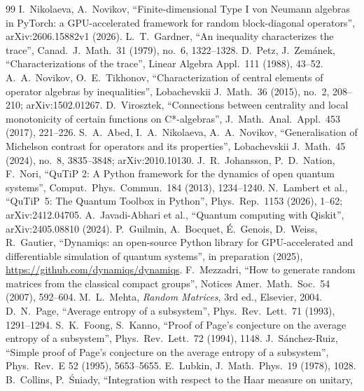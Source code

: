 \documentclass[11pt]{article}
\begin{document}
{\sloppy
\begin{thebibliography}{99}
 I.~Nikolaeva, A.~Novikov, ``Finite-dimensional Type I von Neumann algebras in PyTorch: a
  GPU-accelerated framework for random block-diagonal operators'', arXiv:2606.15882v1 (2026).
 L.~T.~Gardner, ``An inequality characterizes the trace'', Canad.\ J.\ Math.\ 31
  (1979), no.~6, 1322--1328.
 D.~Petz, J.~Zem\'anek, ``Characterizations of the trace'', Linear Algebra Appl.\ 111
  (1988), 43--52.
 A.~A.~Novikov, O.~E.~Tikhonov, ``Characterization of central elements of operator
  algebras by inequalities'', Lobachevskii J.\ Math.\ 36 (2015), no.~2, 208--210; arXiv:1502.01267.
 D.~Virosztek, ``Connections between centrality and local monotonicity of certain
  functions on C*-algebras'', J.\ Math.\ Anal.\ Appl.\ 453 (2017), 221--226.
 S.~A.~Abed, I.~A.~Nikolaeva, A.~A.~Novikov, ``Generalisation of Michelson contrast for
  operators and its properties'', Lobachevskii J.\ Math.\ 45 (2024), no.~8, 3835--3848; arXiv:2010.10130.
 J.~R.~Johansson, P.~D.~Nation, F.~Nori, ``QuTiP 2: A Python framework for the
  dynamics of open quantum systems'', Comput.\ Phys.\ Commun.\ 184 (2013), 1234--1240.
 N.~Lambert et al., ``QuTiP~5: The Quantum Toolbox in Python'', Phys.\ Rep.\ 1153 (2026),
  1--62; arXiv:2412.04705.
 A.~Javadi-Abhari et al., ``Quantum computing with Qiskit'', arXiv:2405.08810 (2024).
 P.~Guilmin, A.~Bocquet, \'E.~Genois, D.~Weiss, R.~Gautier, ``Dynamiqs: an open-source Python
  library for GPU-accelerated and differentiable simulation of quantum systems'', in preparation (2025),
  \url{https://github.com/dynamiqs/dynamiqs}.
 F.~Mezzadri, ``How to generate random matrices from the classical compact
  groups'', Notices Amer.\ Math.\ Soc.\ 54 (2007), 592--604.
 M.~L.~Mehta, \emph{Random Matrices}, 3rd ed., Elsevier, 2004.
 D.~N.~Page, ``Average entropy of a subsystem'', Phys.\ Rev.\ Lett.\ 71 (1993),
  1291--1294.
 S.~K.~Foong, S.~Kanno, ``Proof of Page's conjecture on the average entropy of a subsystem'',
  Phys.\ Rev.\ Lett.\ 72 (1994), 1148.
 J.~S\'anchez-Ruiz, ``Simple proof of Page's conjecture on the average entropy of a
  subsystem'', Phys.\ Rev.\ E 52 (1995), 5653--5655.
 E.~Lubkin, J.\ Math.\ Phys.\ 19 (1978), 1028.
 B.~Collins, P.~\'Sniady, ``Integration with respect to the Haar measure on unitary,

\end{thebibliography}}
\end{document}
